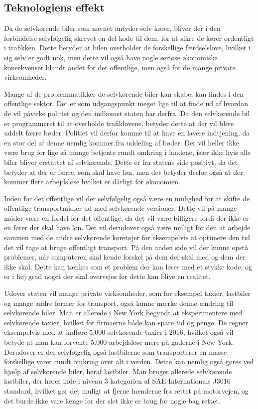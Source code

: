 \subsection{Teknologiens effekt}
Da de selvkørende biler som navnet antyder selv kører, bliver der i den forbindelse selvfølgelig skrevet en del kode til dem, for at sikre de kører ordentligt i trafikken. Dette betyder at bilen overholder de forskellige færdselslove, hvilket i sig selv er godt nok, men dette vil også have nogle seriøse økonomiske konsekvenser blandt andet for det offentlige, men også for de mange private virksomheder. 

Mange af de problemmatikker de selvkørende biler kan skabe, kan findes i den offentlige sektor. Det er som udgangspunkt meget lige til at finde ud af hvordan de vil påvirke politiet og den indkomst staten har derfra. Da den selvkørende bil er programmeret til at overholde trafiklovene, betyder dette at der vil blive uddelt færre bøder. Politiet vil derfor komme til at have en lavere indtjening, da en stor del af denne nemlig kommer fra uddeling af bøder\cite{B}. Der vil heller ikke være brug for lige så mange betjente rundt omkring i landene, især ikke hvis alle biler bliver erstattet af selvkørende. Dette er fra statens side positivt, da det betyder at der er færre, som skal have løn, men det betyder derfor også at der kommer flere arbejdsløse hvilket er dårligt for økonomien.

Inden for det offentlige vil der selvfølgelig også være en mulighed for at skifte de offentlige transportmidler ud med selvkørende versioner. Dette vil på mange måder være en fordel for det offentlige, da det vil være billigere fordi der ikke er en fører der skal have løn. Det vil derudover også være muligt for den at arbejde sammen med de andre selvkørende køretøjer for eksempelvis at optimere den tid det vil tage at bruge offentligt transport. På den anden side vil der kunne opstå problemer, når computeren skal kende forskel på dem der skal med og dem der ikke skal. Dette kan tænkes som et problem der kan løses med et stykke kode, og er i høj grad noget der skal overvejes før dette kan blive en realitet\cite{BUS}.

Udover staten vil mange private virksomheder, som for eksempel taxier, lastbiler og mange andre former for transport, også kunne mærke denne ændring til selvkørende biler. Man er allerede i New York begyndt at eksperimentere med selvkørende taxier, hvilket for firmaerne både kan spare tid og penge. De regner eksempelvis med at indføre 5.000 selvkørende taxier i 2016, hvilket også vil betyde at man kan forvente 5.000 arbejdsløse mere på gaderne i New York\cite{TAXI}. Derudover er der selvfølgelig også lastbilerne som transporterer en masse forskellige varer rundt omkring over alt i verden. Dette kan nemlig også gøres ved hjælp af selvkørende biler, heraf lastbiler. Man bruger allerede selvkørende lastbiler, der hører inde i niveau 3 kategorien af SAE Internationals J3016 standard, hvilket gør det muligt at fjerne hænderne fra rettet på motorvejen, og det burde ikke vare længe før der slet ikke er brug for nogle bag rettet\cite{TRUCKS}.

